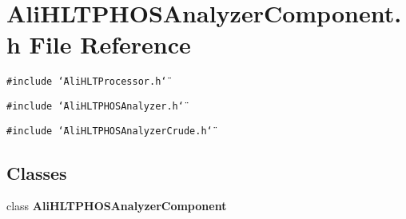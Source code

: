 \section{Ali\-HLTPHOSAnalyzer\-Component.h File Reference}
\label{AliHLTPHOSAnalyzerComponent_8h}
{\tt \#include \char`\"{}Ali\-HLTProcessor.h\char`\"{}}\par
{\tt \#include \char`\"{}Ali\-HLTPHOSAnalyzer.h\char`\"{}}\par
{\tt \#include \char`\"{}Ali\-HLTPHOSAnalyzer\-Crude.h\char`\"{}}\par
\subsection*{Classes}
\begin{CompactItemize}
\item 
class {\bf Ali\-HLTPHOSAnalyzer\-Component}
\end{CompactItemize}
